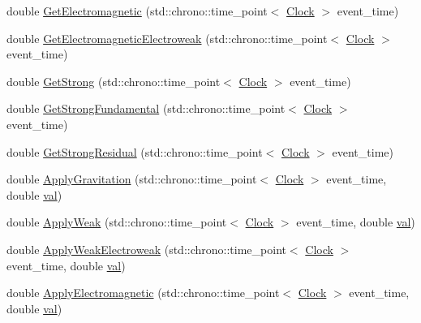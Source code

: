 \begin{DoxyCompactItemize}
\item 
double \mbox{\hyperlink{class_composite_force_particle_a8ef336fed7e33d52a3baae4bd4dd32fd}{Get\+Electromagnetic}} (std\+::chrono\+::time\+\_\+point$<$ \mbox{\hyperlink{universe_8h_a0ef8d951d1ca5ab3cfaf7ab4c7a6fd80}{Clock}} $>$ event\+\_\+time)
\item 
double \mbox{\hyperlink{class_composite_force_particle_ac26d7aab0daefcf13c68aba9e0f2ed53}{Get\+Electromagnetic\+Electroweak}} (std\+::chrono\+::time\+\_\+point$<$ \mbox{\hyperlink{universe_8h_a0ef8d951d1ca5ab3cfaf7ab4c7a6fd80}{Clock}} $>$ event\+\_\+time)
\item 
double \mbox{\hyperlink{class_composite_force_particle_a9818d469c9841eaf77fbe329b0953354}{Get\+Strong}} (std\+::chrono\+::time\+\_\+point$<$ \mbox{\hyperlink{universe_8h_a0ef8d951d1ca5ab3cfaf7ab4c7a6fd80}{Clock}} $>$ event\+\_\+time)
\item 
double \mbox{\hyperlink{class_composite_force_particle_abc8597f3b4f7cf755ab4618bd624b046}{Get\+Strong\+Fundamental}} (std\+::chrono\+::time\+\_\+point$<$ \mbox{\hyperlink{universe_8h_a0ef8d951d1ca5ab3cfaf7ab4c7a6fd80}{Clock}} $>$ event\+\_\+time)
\item 
double \mbox{\hyperlink{class_composite_force_particle_a24214566eb5b44340d5563b6583052e8}{Get\+Strong\+Residual}} (std\+::chrono\+::time\+\_\+point$<$ \mbox{\hyperlink{universe_8h_a0ef8d951d1ca5ab3cfaf7ab4c7a6fd80}{Clock}} $>$ event\+\_\+time)
\item 
double \mbox{\hyperlink{class_composite_force_particle_ae26a03c2970a3825e8583a811339b28d}{Apply\+Gravitation}} (std\+::chrono\+::time\+\_\+point$<$ \mbox{\hyperlink{universe_8h_a0ef8d951d1ca5ab3cfaf7ab4c7a6fd80}{Clock}} $>$ event\+\_\+time, double \mbox{\hyperlink{glad_8h_a26942fd2ed566ef553eae82d2c109c8f}{val}})
\item 
double \mbox{\hyperlink{class_composite_force_particle_a1fd171a0c6fab0cbf9a45a0d24607bde}{Apply\+Weak}} (std\+::chrono\+::time\+\_\+point$<$ \mbox{\hyperlink{universe_8h_a0ef8d951d1ca5ab3cfaf7ab4c7a6fd80}{Clock}} $>$ event\+\_\+time, double \mbox{\hyperlink{glad_8h_a26942fd2ed566ef553eae82d2c109c8f}{val}})
\item 
double \mbox{\hyperlink{class_composite_force_particle_a3c1c0b427c633f0685f1d812e02b92ff}{Apply\+Weak\+Electroweak}} (std\+::chrono\+::time\+\_\+point$<$ \mbox{\hyperlink{universe_8h_a0ef8d951d1ca5ab3cfaf7ab4c7a6fd80}{Clock}} $>$ event\+\_\+time, double \mbox{\hyperlink{glad_8h_a26942fd2ed566ef553eae82d2c109c8f}{val}})
\item 
double \mbox{\hyperlink{class_composite_force_particle_afa4dc18258722b3c85fbc9789a4297a5}{Apply\+Electromagnetic}} (std\+::chrono\+::time\+\_\+point$<$ \mbox{\hyperlink{universe_8h_a0ef8d951d1ca5ab3cfaf7ab4c7a6fd80}{Clock}} $>$ event\+\_\+time, double \mbox{\hyperlink{glad_8h_a26942fd2ed566ef553eae82d2c109c8f}{val}})

\end{DoxyCompactItemize}
